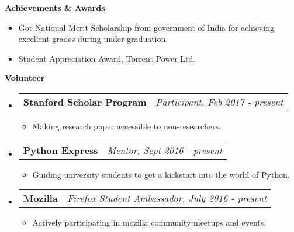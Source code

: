 \documentclass[letterpaper,10pt]{article}
\makeatletter
\newcommand{\resitem}[1]{\item #1 \vspace{-2pt}}
\newcommand{\resheading}[1]{{\large \colorbox{mygrey}{\begin{minipage}{\textwidth}{\textbf{#1 \vphantom{p\^{E}}}}\end{minipage}}}}
\newcommand{\ressubheading}[4]{
\begin{tabular*}{7.0in}{l@{\extracolsep{\fill}}r}
		\textbf{#1} & \textit{#4} \\
\end{tabular*}\vspace{-6pt}}
\makeatother
\begin{document}
\resheading{Achievements \& Awards}
\begin{itemize}
	\item Got National Merit Scholarship from government of India for achieving excellent grades during under-graduation.
	\item Student Appreciation Award, Torrent Power Ltd.
\end{itemize}

\resheading{Volunteer}
\begin{itemize}


\item
	\ressubheading{Stanford Scholar Program}{Remote}{Participant}{Participant, Feb 2017 - present}
	\begin{itemize}
		\resitem{Making research paper accessible to non-researchers.}
	\end{itemize}

\item
	\ressubheading{Python Express}{Remote}{Mentor}{Mentor, Sept 2016 - present}
	\begin{itemize}
		\resitem{Guiding university students to get a kickstart into the world of Python.}
	\end{itemize}
	
\item
	\ressubheading{Mozilla}{Remote}{Firefox Student Ambassador}{Firefox Student Ambassador, July 2016 - present}
	\begin{itemize}
		\resitem{Actively participating in mozilla community meetups and events.}
	\end{itemize}
	
\end{itemize}
\end{document}
